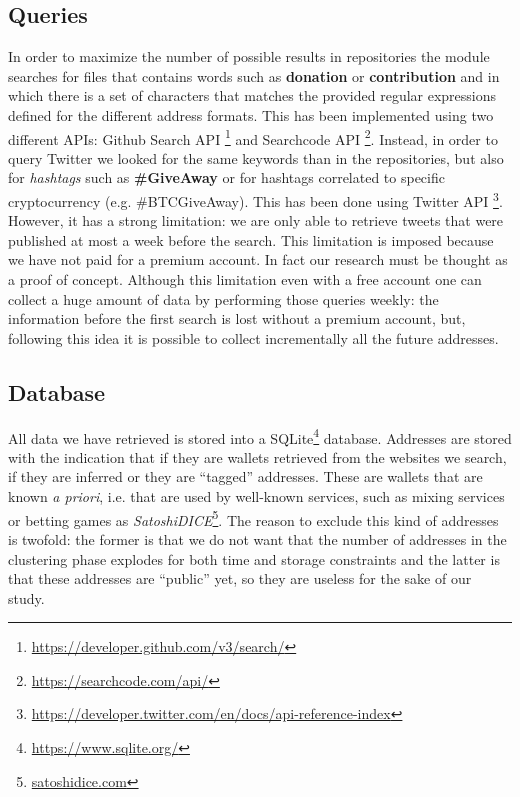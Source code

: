 \subsection{Queries}
\label{sec:queries}
In order to maximize the number of possible results in repositories the module
\walletcollector{} searches for files that contains words such as
\textbf{donation} or \textbf{contribution} and in which there is a set of
characters that matches the provided regular expressions defined for the
different address formats. This has been implemented using two different APIs:
Github Search API \footnote{\url{https://developer.github.com/v3/search/}} and
Searchcode API \footnote{\url{https://searchcode.com/api/}}.
Instead, in order to query Twitter we looked for the same keywords than in the
repositories, but also for \textit{hashtags} such as \textbf{\#GiveAway} or for
hashtags correlated to specific cryptocurrency (e.g. \#BTCGiveAway). This has
been done using Twitter API
\footnote{\url{https://developer.twitter.com/en/docs/api-reference-index}}.
However, it has a strong limitation: we are only able to retrieve tweets that
were published at most a week before the search. This limitation is imposed
because we have not paid for a premium account. In fact our research must be
thought as a proof of concept.
Although this limitation even with a free account one can collect a huge amount
of data by performing those queries weekly:
the information before the first search is lost without a premium account, but,
following this idea it is possible to collect incrementally all the future
addresses.

\subsection{Database}
All data we have retrieved is stored into a
SQLite\footnote{\url{https://www.sqlite.org/}} database. Addresses are stored
with the indication that if they are wallets retrieved from the websites we
search, if they are inferred or they are ``tagged'' addresses. These are
wallets that are known \emph{a priori}, i.e. that are used by well-known
services, such as mixing services or betting games as
\textit{SatoshiDICE}\footnote{\url{satoshidice.com}}.
The reason to exclude this kind of addresses is twofold: the former is that we
do not want that the number of addresses in the clustering phase explodes for
both time and storage constraints and the latter is that these
addresses are ``public'' yet, so they are useless for the sake of our study.

